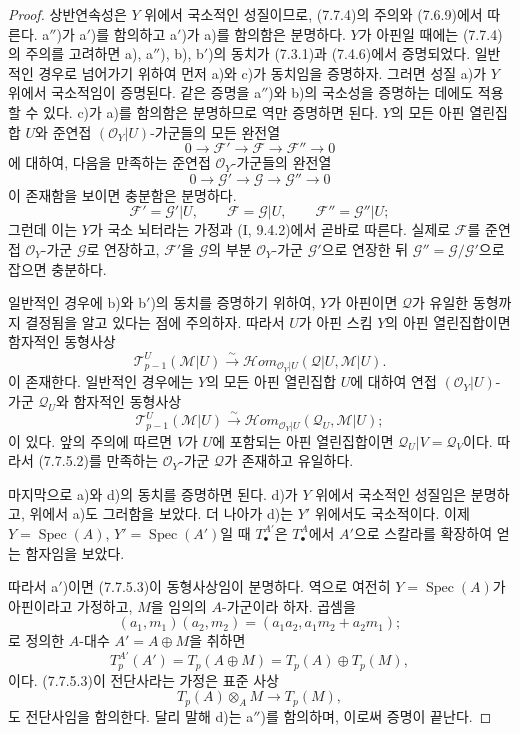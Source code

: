 \begin{proof}
상반연속성은 $Y$ 위에서 국소적인 성질이므로, (7.7.4)의 주의와
(7.6.9)에서 따른다. a$''$)가 a$'$)를 함의하고 a$'$)가 a)를 함의함은
분명하다. $Y$가 아핀일 때에는 (7.7.4)의 주의를 고려하면 a), a$''$),
b), b$'$)의 동치가 (7.3.1)과 (7.4.6)에서 증명되었다. 일반적인 경우로
넘어가기 위하여 먼저 a)와 c)가 동치임을 증명하자. 그러면 성질 a)가
$Y$ 위에서 국소적임이 증명된다. 같은 증명을 a$''$)와 b)의 국소성을
증명하는 데에도 적용할 수 있다. c)가 a)를 함의함은 분명하므로 역만
증명하면 된다. $Y$의 모든 아핀 열린집합 $U$와 준연접
$(\mathscr O_Y|U)$-가군들의 모든 완전열
\[
  0\longrightarrow\mathscr F'
  \longrightarrow\mathscr F
  \longrightarrow\mathscr F''
  \longrightarrow0
\]
에 대하여, 다음을 만족하는 준연접 $\mathscr O_Y$-가군들의 완전열
\[
  0\longrightarrow\mathscr G'
  \longrightarrow\mathscr G
  \longrightarrow\mathscr G''
  \longrightarrow0
\]
이 존재함을 보이면 충분함은 분명하다.
\[
  \mathscr F'=\mathscr G'|U,
  \qquad
  \mathscr F=\mathscr G|U,
  \qquad
  \mathscr F''=\mathscr G''|U;
\]
그런데 이는 $Y$가 국소 뇌터라는 가정과 (I, 9.4.2)에서 곧바로 따른다.
실제로 $\mathscr F$를 준연접 $\mathscr O_Y$-가군 $\mathscr G$로
연장하고, $\mathscr F'$을 $\mathscr G$의 부분 $\mathscr O_Y$-가군
$\mathscr G'$으로 연장한 뒤
$\mathscr G''=\mathscr G/\mathscr G'$으로 잡으면 충분하다.

일반적인 경우에 b)와 b$'$)의 동치를 증명하기 위하여, $Y$가 아핀이면
$\mathscr Q$가 유일한 동형까지 결정됨을 알고 있다는 점에 주의하자.
따라서 $U$가 아핀 스킴 $Y$의 아핀 열린집합이면 함자적인 동형사상
\[
  \mathscr T_{p-1}^{U}(\mathscr M|U)
  \xrightarrow{\sim}
  \mathscr{H}\!om_{\mathscr O_Y|U}
    (\mathscr Q|U,\mathscr M|U).
\]
이 존재한다. 일반적인 경우에는 $Y$의 모든 아핀 열린집합 $U$에 대하여
연접 $(\mathscr O_Y|U)$-가군 $\mathscr Q_U$와 함자적인 동형사상
\[
  \mathscr T_{p-1}^{U}(\mathscr M|U)
  \xrightarrow{\sim}
  \mathscr{H}\!om_{\mathscr O_Y|U}
    (\mathscr Q_U,\mathscr M|U);
\]
이 있다. 앞의 주의에 따르면 $V$가 $U$에 포함되는 아핀 열린집합이면
$\mathscr Q_U|V=\mathscr Q_V$이다. 따라서 (7.7.5.2)를 만족하는
$\mathscr O_Y$-가군 $\mathscr Q$가 존재하고 유일하다.

마지막으로 a)와 d)의 동치를 증명하면 된다. d)가 $Y$ 위에서 국소적인
성질임은 분명하고, 위에서 a)도 그러함을 보았다. 더 나아가 d)는 $Y'$
위에서도 국소적이다. 이제 $Y=\operatorname{Spec}(A)$,
$Y'=\operatorname{Spec}(A')$일 때 $T_\bullet^{A'}$은
$T_\bullet^A$에서 $A'$으로 스칼라를 확장하여 얻는 함자임을 보았다.

따라서 a$'$)이면 (7.7.5.3)이 동형사상임이 분명하다. 역으로 여전히
$Y=\operatorname{Spec}(A)$가 아핀이라고 가정하고, $M$을 임의의
$A$-가군이라 하자. 곱셈을
\[
  (a_1,m_1)(a_2,m_2)
  =
  (a_1a_2,a_1m_2+a_2m_1);
\]
로 정의한 $A$-대수 $A'=A\oplus M$을 취하면
\[
  T_p^{A'}(A')
  =
  T_p(A\oplus M)
  =
  T_p(A)\oplus T_p(M),
\]
이다. (7.7.5.3)이 전단사라는 가정은 표준 사상
\[
  T_p(A)\otimes_A M\longrightarrow T_p(M),
\]
도 전단사임을 함의한다. 달리 말해 d)는 a$''$)를 함의하며, 이로써
증명이 끝난다.
\end{proof}

